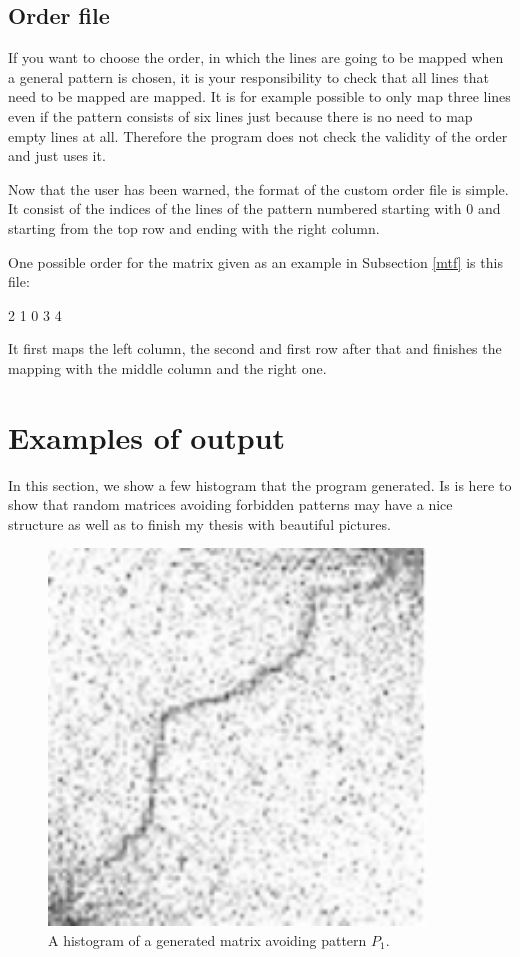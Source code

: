 \subsection{Order file}
\label{of}
If you want to choose the order, in which the lines are going to be mapped when a general pattern is chosen, it is your responsibility to check that all lines that need to be mapped are mapped. It is for example possible to only map three lines even if the pattern consists of six lines just because there is no need to map empty lines at all. Therefore the program does not check the validity of the order and just uses it.

Now that the user has been warned, the format of the custom order file is simple. It consist of the indices of the lines of the pattern numbered starting with 0 and starting from the top row and ending with the right column.

One possible order for the matrix given as an example in Subsection \ref{mtf} is this file:
\begin{center}
2 1 0 3 4
\end{center}
It first maps the left column, the second and first row after that and finishes the mapping with the middle column and the right one.

\section{Examples of output}
In this section, we show a few histogram that the program generated. Is is here to show that random matrices avoiding forbidden patterns may have a nice structure as well as to finish my thesis with beautiful pictures.

\begin{figure}[h!]
\centering
\includegraphics[width=100mm]{../img/walker.pdf}
\caption{A histogram of a generated matrix avoiding pattern $P_1$.}
\label{walker}
\end{figure}


